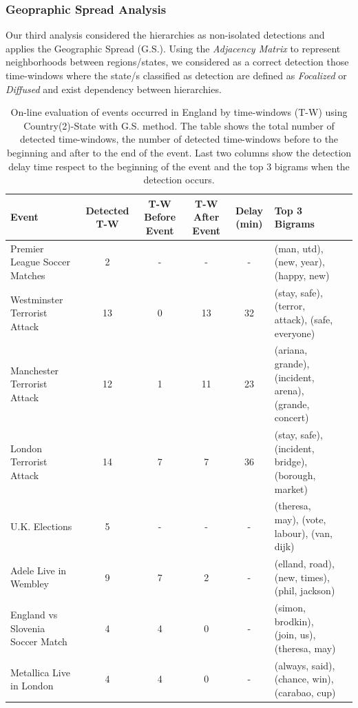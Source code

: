 \documentclass[sigconf]{acmart}
\begin{document}
\subsubsection{Geopraphic Spread Analysis}\label{sssec:geospreadanalysis}
Our third analysis considered the hierarchies as non-isolated detections and applies the Geographic Spread (G.S.). Using the \textit{Adjacency Matrix} to represent neighborhoods between regions/states, we considered as a correct detection those time-windows where the state/s classified as detection are defined as \textit{Focalized} or \textit{Diffused} and exist dependency between hierarchies. 

\begin{table}
	\caption{On-line evaluation of events occurred in England by time-windows (T-W) using Country(2)-State with G.S. method. The table shows the total number of detected time-windows, the number of detected time-windows before to the beginning and after to the end of the event. Last two columns show the detection delay time respect to the beginning of the event and the top 3 bigrams when the detection occurs.}
	\label{tab:online1}
	\begin{tabular}{lccccp{3.5cm}c}
		\toprule
		Event &Detected T-W & T-W Before Event & T-W After Event & Delay (min) & Top 3 Bigrams\\
		\midrule
		Premier League Soccer Matches & 2& - & - & - & \small{(man, utd), (new, year), (happy, new)} \\
		Westminster Terrorist Attack& 13 & 0 &13 & 32& \small{(stay, safe), (terror, attack), (safe, everyone)}\\
		Manchester Terrorist Attack& 12& 1& 11& 23& \small{(ariana, grande), (incident, arena), (grande, concert)}\\
		London Terrorist Attack & 14 & 7 & 7 & 36 & \small{(stay, safe), (incident, bridge), (borough, market)}\\
		U.K. Elections& 5 & - & - & - & \small{(theresa, may), (vote, labour), (van, dijk)}\\
		Adele Live in Wembley& 9& 7&2&-& \small{(elland, road), (new, times), (phil, jackson)}\\
		England vs Slovenia Soccer Match & 4& 4 & 0 & - & \small{(simon, brodkin), (join, us), (theresa, may)}\\
		Metallica Live in London& 4 & 4 & 0 & - & \small{(always, said), (chance, win), (carabao, cup)}\\
		\bottomrule
	\end{tabular}
\end{table}
\end{document}
